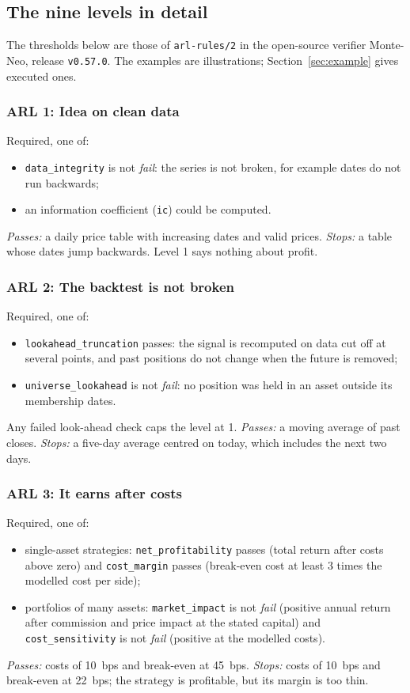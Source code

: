 \documentclass[11pt]{article}
\newcommand{\chk}[1]{\texttt{#1}}
\newcommand{\lvl}[2]{\subsubsection*{ARL #1: #2}}
\begin{document}
\subsection{The nine levels in detail}\label{sec:levels}

The thresholds below are those of \texttt{arl-rules/2} in the open-source verifier Monte-Neo, release
\texttt{v0.57.0}. The examples are illustrations; Section~\ref{sec:example} gives executed ones.

\lvl{1}{Idea on clean data}
Required, one of:
\begin{itemize}
\item \chk{data\_integrity} is not \emph{fail}: the series is not broken, for example dates do not run backwards;
\item an information coefficient (\chk{ic}) could be computed.
\end{itemize}
\emph{Passes:} a daily price table with increasing dates and valid prices. \emph{Stops:} a table whose dates jump
backwards. Level 1 says nothing about profit.

\lvl{2}{The backtest is not broken}
Required, one of:
\begin{itemize}
\item \chk{lookahead\_truncation} passes: the signal is recomputed on data cut off at several points, and past positions
do not change when the future is removed;
\item \chk{universe\_lookahead} is not \emph{fail}: no position was held in an asset outside its membership dates.
\end{itemize}
Any failed look-ahead check caps the level at 1. \emph{Passes:} a moving average of past closes. \emph{Stops:} a
five-day average centred on today, which includes the next two days.

\lvl{3}{It earns after costs}
Required, one of:
\begin{itemize}
\item single-asset strategies: \chk{net\_profitability} passes (total return after costs above zero) and
\chk{cost\_margin} passes (break-even cost at least 3 times the modelled cost per side);
\item portfolios of many assets: \chk{market\_impact} is not \emph{fail} (positive annual return after commission and
price impact at the stated capital) and \chk{cost\_sensitivity} is not \emph{fail} (positive at the modelled costs).
\end{itemize}
\emph{Passes:} costs of 10~bps and break-even at 45~bps. \emph{Stops:} costs of 10~bps and break-even at 22~bps; the
strategy is profitable, but its margin is too thin.
\end{document}
